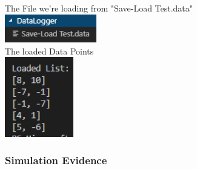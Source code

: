 \begin{center}
    The File we're loading from "Save-Load Test.data" \\
    \includegraphics[width=4cm]{Images/Testing/T4.8.2.PNG} \\
    The loaded Data Points \\
    \includegraphics[width=3cm]{Images/Testing/T4.9.1.PNG} \\
    \vspace{1cm}
\end{center}

\subsubsection{Simulation Evidence}

